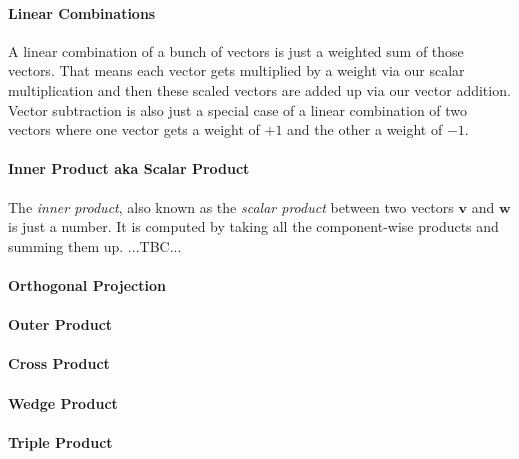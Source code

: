 
\paragraph{Linear Combinations}
A linear combination of a bunch of vectors is just a weighted sum of those vectors. That means each vector gets multiplied by a weight via our scalar multiplication and then these scaled vectors are added up via our vector addition. Vector subtraction is also just a special case of a linear combination of two vectors where one vector gets a weight of $+1$ and the other a weight of $-1$. 

\paragraph{Inner Product aka Scalar Product}
The \emph{inner product}, also known as the \emph{scalar product} between two vectors $\mathbf{v}$ and $\mathbf{w}$ is just a number. It is computed by taking all the component-wise products and summing them up. ...TBC...


\paragraph{Orthogonal Projection}


\paragraph{Outer Product}
\paragraph{Cross Product}
\paragraph{Wedge Product}
\paragraph{Triple Product}






